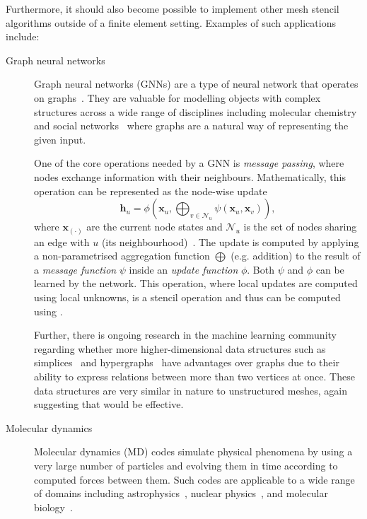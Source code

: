 \documentclass[thesis]{subfiles}
\begin{document}
Furthermore, it should also become possible to implement other mesh stencil algorithms outside of a finite element setting.
Examples of such applications include:
\begin{description}
  \item[Graph neural networks]
    Graph neural networks (GNNs) are a type of neural network that operates on graphs~\cite{scarselliGraphNeuralNetwork2009}.
    They are valuable for modelling objects with complex structures across a wide range of disciplines including molecular chemistry~\cite{stokesDeepLearningApproach2020} and social networks~\cite{montiFAKENEWSDETECTION2019} where graphs are a natural way of representing the given input.

    One of the core operations needed by a GNN is \emph{message passing}, where nodes exchange information with their neighbours.
    Mathematically, this operation can be represented as the node-wise update
    \begin{equation}
      \mathbf{h}_u = \phi \left( \mathbf{x}_u, \bigoplus_{v \in \mathcal{N}_u} \psi(\mathbf{x}_u, \mathbf{x}_v) \right),
    \end{equation}
    where $\mathbf{x}_{(\cdot)}$ are the current node states and $\mathcal{N}_u$ is the set of nodes sharing an edge with $u$ (its neighbourhood)~\cite{bronsteinGeometricDeepLearning2021}.
    The update is computed by applying a non-parametrised aggregation function $\bigoplus$ (e.g. addition) to the result of a \emph{message function} $\psi$ inside an \emph{update function} $\phi$.
    Both $\psi$ and $\phi$ can be learned by the network.
    This operation, where local updates are computed using local unknowns, is a stencil operation and thus can be computed using .

    Further, there is ongoing research in the machine learning community regarding whether more higher-dimensional data structures such as simplices~\cite{hwangMultiorderSimplexBasedGraph2024} and hypergraphs~\cite{fengHypergraphNeuralNetworks2019} have advantages over graphs due to their ability to express relations between more than two vertices at once.
    These data structures are very similar in nature to unstructured meshes, again suggesting that  would be effective.
  \item[Molecular dynamics]
    Molecular dynamics (MD) codes simulate physical phenomena by using a very large number of particles and evolving them in time according to computed forces between them.
    Such codes are applicable to a wide range of domains including astrophysics~\cite{horowitzNeutronStarCrust2011}, nuclear physics~\cite{williamsAtomisticInvestigationStructure2015}, and molecular biology~\cite{hollingsworthMolecularDynamicsSimulation2018}.


\end{description}
\end{document}
